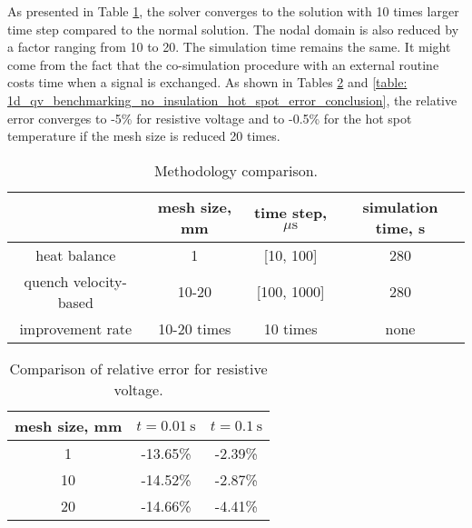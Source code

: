 
As presented in Table \ref{table: 1d_qv_benchmarking_no_insulation_methods_comparison}, the solver converges to the solution with 10 times larger time step compared to the normal solution. The nodal domain is also reduced by a factor ranging from 10 to 20. The simulation time remains the same. It might come from the fact that the co-simulation procedure with an external routine costs time when a signal is exchanged. As shown in Tables \ref{table: 1d_qv_benchmarking_no_insulation_res_error_conclusion} and \ref{table: 1d_qv_benchmarking_no_insulation_hot_spot_error_conclusion}, the relative error converges to -5\% for resistive voltage and to -0.5\% for the hot spot temperature if the mesh size is reduced 20 times.

\begin{table}[H]
    \caption{Methodology comparison.} 
    \vspace{-1.em} 
    \fontsize{10}{10}
    \selectfont 
    \renewcommand{\arraystretch}{1.5}
    \begin{center}
        \begin{tabular}{ cccc }  
        \hline
          & mesh size, mm & time step, $\mu \text{s}$ & simulation time, s\\
        \hline
        heat balance & 1 & [10, 100] & 280 \\
        quench velocity-based & 10-20 & [100, 1000] & 280 \\
        \hline 
        improvement rate & 10-20 times & 10 times & none\\
        \end{tabular}
    \end{center}  
     \label{table: 1d_qv_benchmarking_no_insulation_methods_comparison} 
 \end{table}
 

 
 \begin{table}[H]
    \caption{Comparison of relative error for resistive voltage.} 
    \vspace{-1.em} 
    \fontsize{10}{10}
    \selectfont 
    \renewcommand{\arraystretch}{1.5}
    \begin{center}
        \begin{tabular}{ ccc }  
        \hline
        mesh size, mm & $t=0.01~\text{s}$ & $t=0.1~\text{s}$ \\
        \hline
        1 & -13.65\% & -2.39\% \\
        10 & -14.52\% & -2.87\% \\
        20 & -14.66\% & -4.41\% \\
        \hline 
        \end{tabular}
    \end{center}  
     \label{table: 1d_qv_benchmarking_no_insulation_res_error_conclusion} 
 \end{table}

